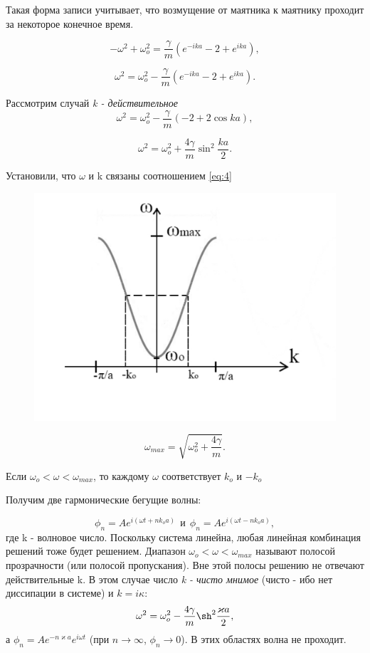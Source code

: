 Такая форма записи учитывает, что возмущение от маятника к маятнику проходит за некоторое конечное время.

\begin{equation*}
	-\omega^2+\omega_o^2=\frac{\gamma}{m}(e^{-ika}-2+e^{ika}),
\end{equation*}

\begin{equation}
	\omega^2=\omega_o^2-\frac{\gamma}{m}(e^{-ika}-2+e^{ika}).
	\label{eq:3}
\end{equation}

Рассмотрим случай \textit{k - действительное}
\begin{equation*}
	\omega^2=\omega_o^2-\frac{\gamma}{m}(-2+2\cos{ka}),
\end{equation*}

\begin{equation}
	\omega^2=\omega_o^2+\frac{4\gamma}{m}\sin^2{\frac{ka}{2}}.
	\label{eq:4}
\end{equation}

Установили, что $\omega$ и k связаны соотношением \eqref{eq:4}

\begin{figure}[H]
	\centering
	\includegraphics[width=0.5\linewidth]{fig/fig2.pdf}   
\end{figure}

\begin{equation*}
	\omega_{max}=\sqrt{\omega_o^2+\frac{4\gamma}{m}}.
\end{equation*}

Если $\omega_o < \omega < \omega_{max}$, то каждому $\omega$ соответствует $k_o$ и $-k_o$

Получим две гармонические бегущие волны:

\begin{equation*}
	\phi_n=A e^{i(\omega t+nk_oa)} ~~\text{и} ~~\phi_n=A e^{i(\omega t-nk_oa)},
\end{equation*}
где k - волновое число. Поскольку система линейна, любая линейная комбинация решений тоже будет решением. Диапазон $\omega_o < \omega < \omega_{max}$ называют полосой прозрачности (или полосой пропускания). Вне этой полосы решению не отвечают действительные k. В этом случае число \textit{k - чисто мнимое} (чисто - ибо нет диссипации в системе) и $k=i\kappa$:
\begin{equation}
	\omega^2=\omega_o^2-\frac{4\gamma}{m}\sh^2{\frac{\varkappa a}{2}},
	\label{eq:5}
\end{equation}
а $\phi_n=A e^{-n\varkappa a} e^{i\omega t}$ (при $n\rightarrow \infty$, $\phi_n \rightarrow 0$). В этих областях волна не проходит. 

